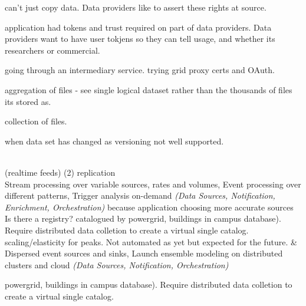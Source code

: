 \documentclass[times]{cpeauth}
\begin{document}
\begin{table}[h]
\begin{scriptsize}
\begin{center}
can't just copy data. Data providers like to assert these rights at source.

application had tokens and trust required on part of data providers. Data
providers want to have user tokjens so they can tell usage, and whether its
researchers or commercial.

going through an intermediary service. trying grid proxy certs and OAuth.


aggregation of files - see single logical dataset rather than the thousands of
files its stored as.

collection of files.

when data set has changed as versioning not well supported.

\\ \hline %
(realtime feeds) (2) %
replication\\ %
	
Stream processing over variable sources, rates and volumes, Event processing
over different patterns, Trigger analysis on-demand \emph{(Data Sources,
Notification, Enrichment, Orchestration)} %
because application choosing more accurate sources %
Is there a registry?  %
catalogued by powergrid, buildings in campus database). Require distributed data
colletion to create a virtual single catalog.  %
scaling/elasticity for peaks. Not automated as yet but expected for the future.
& Dispersed event sources and sinks, Launch ensemble modeling on distributed
clusters and cloud \emph{(Data Sources, Notification, Orchestration)} %

powergrid, buildings in campus database). Require distributed data colletion to
create a virtual single catalog.


\end{center}
\end{scriptsize}
\end{table}
\end{document}
